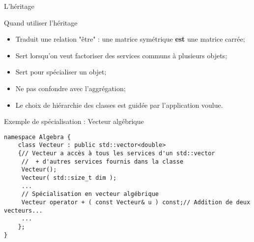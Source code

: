 \documentclass[handout,10pt]{beamer}
\begin{document}
\begin{frame}[fragile]{L'héritage}
\tiny
\begin{block}{Quand utiliser l'héritage}
\begin{itemize}
\item Traduit une relation "être" : une matrice symétrique \textbf{est} une matrice carrée;
\item Sert lorsqu'on veut factoriser des services communs à plusieurs objets;
\item Sert pour spécialiser un objet;
\item Ne pas confondre avec l'aggrégation;
\item Le choix de hiérarchie des classes est guidée par l'application voulue.
\end{itemize}
\end{block}

\begin{exampleblock}{Exemple de spécialisation : Vecteur algébrique}
\begin{lstlisting}
namespace Algebra {
    class Vecteur : public std::vector<double>
    {// Vecteur a accès à tous les services d'un std::vector
     //  + d'autres services fournis dans la classe
     Vecteur();
     Vecteur( std::size_t dim );
     ...
     // Spécialisation en vecteur algébrique
     Vecteur operator + ( const Vecteur& u ) const;// Addition de deux vecteurs...
     ...
    };
}
\end{lstlisting}
\end{exampleblock}
\end{frame}
\end{document}
